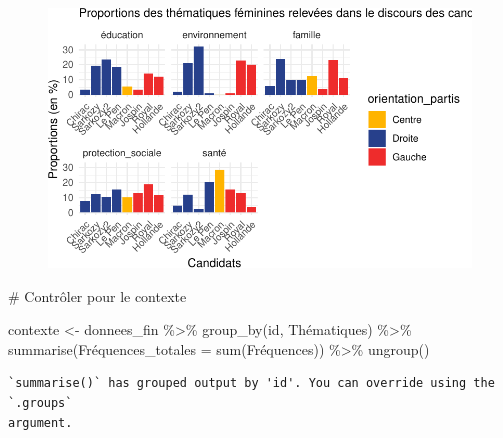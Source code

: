 \documentclass[
  letterpaper,
  DIV=11,
  numbers=noendperiod]{scrartcl}
\newenvironment{Shaded}{\begin{snugshade}}{\end{snugshade}}
\newcommand{\AttributeTok}[1]{\textcolor[rgb]{0.40,0.45,0.13}{#1}}
\newcommand{\CommentTok}[1]{\textcolor[rgb]{0.37,0.37,0.37}{#1}}
\newcommand{\FunctionTok}[1]{\textcolor[rgb]{0.28,0.35,0.67}{#1}}
\newcommand{\NormalTok}[1]{\textcolor[rgb]{0.00,0.23,0.31}{#1}}
\newcommand{\OtherTok}[1]{\textcolor[rgb]{0.00,0.23,0.31}{#1}}
\newcommand{\SpecialCharTok}[1]{\textcolor[rgb]{0.37,0.37,0.37}{#1}}
\begin{document}
\begin{figure}[H]

{\centering \includegraphics{Travail-Session_files/figure-pdf/unnamed-chunk-2-9.pdf}

}

\end{figure}

\begin{Shaded}
\begin{Highlighting}[]
\CommentTok{\# Contrôler pour le contexte}

\NormalTok{contexte }\OtherTok{\textless{}{-}}\NormalTok{ donnees\_fin }\SpecialCharTok{\%\textgreater{}\%} \FunctionTok{group\_by}\NormalTok{(id, Thématiques) }\SpecialCharTok{\%\textgreater{}\%} \FunctionTok{summarise}\NormalTok{(Fréquences}\AttributeTok{\_totales =} \FunctionTok{sum}\NormalTok{(Fréquences)) }\SpecialCharTok{\%\textgreater{}\%} \FunctionTok{ungroup}\NormalTok{()}
\end{Highlighting}
\end{Shaded}

\begin{verbatim}
`summarise()` has grouped output by 'id'. You can override using the `.groups`
argument.
\end{verbatim}
\end{document}
